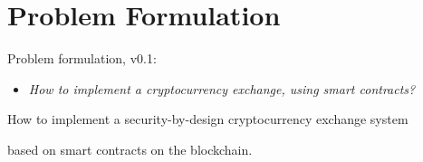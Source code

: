 \section{Problem Formulation}
% 
Problem formulation, v0.1:

\begin{itemize}
    \item \textit{How to implement a cryptocurrency exchange, using smart contracts?}
\end{itemize}

How to implement a security-by-design cryptocurrency exchange system

based on smart contracts on the blockchain.